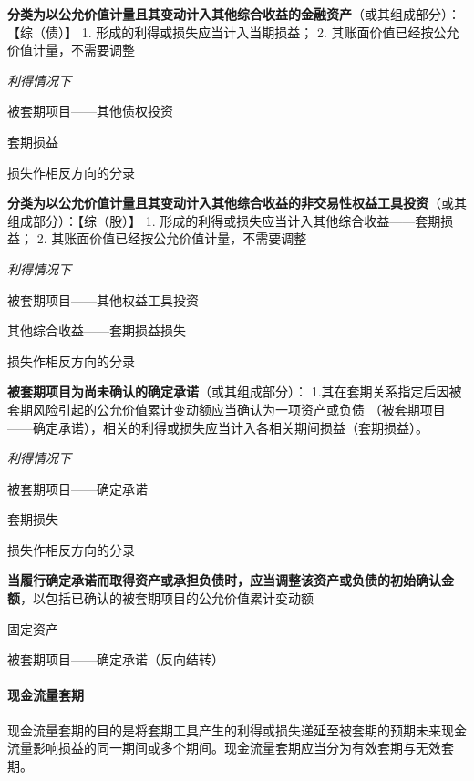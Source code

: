\documentclass[UTF8,12pt]{ctexart}
\newenvironment{Dr}{%
	\begin{list}{}%
		{
			\setlength{\leftmargin}{2em}
			\setlength{\labelwidth}{2em}
			\setlength{\labelsep}{0pt}
			\setlength{\itemindent}{0pt}
			\setlength{\listparindent}{0pt}
			\setlength{\parsep}{0pt}
			\setlength{\topsep}{0pt}
		}
		\item[\textbf{借：}]
	}{%
	\end{list}
}
\newenvironment{Cr}{%
	\begin{list}{}%
		{
			\setlength{\leftmargin}{2em}
			\setlength{\labelwidth}{2em}
			\setlength{\labelsep}{0pt}
			\setlength{\itemindent}{0pt}
			\setlength{\listparindent}{0pt}
			\setlength{\parsep}{0pt}
			\setlength{\topsep}{0pt}
		}
		\item[\textbf{贷：}]
	}{%
	\end{list}
}
\numberwithin{equation}{section} %
\numberwithin{figure}{section}
\numberwithin{table}{section}
\begin{document}
	\textbf{分类为以公允价值计量且其变动计入其他综合收益的金融资产}（或其组成部分）：【综（债）】
	1.	形成的利得或损失应当计入当期损益；
	2.	其账面价值已经按公允价值计量，不需要调整
	
	\textit{利得情况下}
	
	\begin{Dr}
		被套期项目——其他债权投资
	\end{Dr}
	\begin{Cr}
		套期损益
	\end{Cr}
	损失作相反方向的分录
	
	\textbf{分类为以公允价值计量且其变动计入其他综合收益的非交易性权益工具投资}（或其组成部分）：【综（股）】
	1.	形成的利得或损失应当计入其他综合收益——套期损益；
	2.	其账面价值已经按公允价值计量，不需要调整
	
	\textit{利得情况下}
	
	\begin{Dr}
		被套期项目——其他权益工具投资
	\end{Dr}
	\begin{Cr}
		其他综合收益——套期损益损失
	\end{Cr}
	损失作相反方向的分录
	
	\textbf{被套期项目为尚未确认的确定承诺}（或其组成部分）：
	1.其在套期关系指定后因被套期风险引起的公允价值累计变动额应当确认为一项资产或负债
	（被套期项目——确定承诺），相关的利得或损失应当计入各相关期间损益（套期损益）。
	
	\textit{利得情况下}
	
	\begin{Dr}
		被套期项目——确定承诺
	\end{Dr}
	\begin{Cr}
		套期损失
	\end{Cr}
	损失作相反方向的分录
	
	\textbf{当履行确定承诺而取得资产或承担负债时，应当调整该资产或负债的初始确认金额}，以包括已确认的被套期项目的公允价值累计变动额
	
	\begin{Dr}
		固定资产
	\end{Dr}
	\begin{Cr}
		被套期项目——确定承诺（反向结转）
	\end{Cr}
	
	
	\paragraph{现金流量套期}
	现金流量套期的目的是将套期工具产生的利得或损失递延至被套期的预期未来现金流量影响损益的同一期间或多个期间。现金流量套期应当分为有效套期与无效套期。
	
\end{document}
